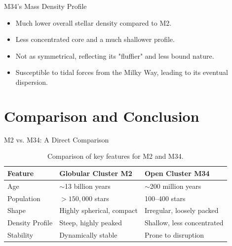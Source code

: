 \documentclass{beamer}
\begin{document}
\begin{frame}{M34's Mass Density Profile}
    \begin{itemize}
        \item Much \alert{lower overall stellar density} compared to M2.
        \item Less concentrated core and a much shallower profile.
        \item Not as symmetrical, reflecting its "fluffier" and less bound nature.
        \item Susceptible to tidal forces from the Milky Way, leading to its eventual dispersion.
    \end{itemize}
    \begin{figure}
        \centering
    \end{figure}
\end{frame}

\section{Comparison and Conclusion}

\begin{frame}{M2 vs. M34: A Direct Comparison}
    \begin{table}
        \centering
        \begin{tabular}{l l l}
            \toprule
            \textbf{Feature} & \textbf{Globular Cluster M2} & \textbf{Open Cluster M34} \\
            \midrule
            Age & $\sim$\num{13} billion years & $\sim$\num{200} million years \\
            Population & $>150,000$ stars & \num{100}--\num{400} stars \\
            Shape & Highly spherical, compact & Irregular, loosely packed \\
            Density Profile & Steep, highly peaked & Shallow, less concentrated \\
            Stability & Dynamically stable & Prone to disruption \\
            \bottomrule
        \end{tabular}
        \caption{Comparison of key features for M2 and M34.}
    \end{table}
\end{frame}
\end{document}
